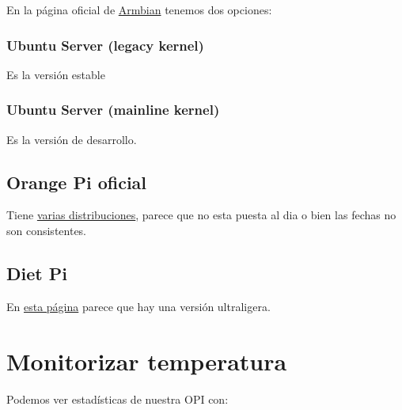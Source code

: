 \documentclass[12pt,spanish,]{scrartcl}
\begin{document}
En la página oficial de
\href{https://www.armbian.com/orange-pi-zero/}{Armbian} tenemos dos
opciones:

\hypertarget{ubuntu-server-legacy-kernel}{%
\subsubsection{Ubuntu Server (legacy
kernel)}\label{ubuntu-server-legacy-kernel}}

Es la versión estable

\hypertarget{ubuntu-server-mainline-kernel}{%
\subsubsection{Ubuntu Server (mainline
kernel)}\label{ubuntu-server-mainline-kernel}}

Es la versión de desarrollo.

\hypertarget{orange-pi-oficial}{%
\subsection{Orange Pi oficial}\label{orange-pi-oficial}}

Tiene \href{http://www.orangepi.org/downloadresources/}{varias
distribuciones}, parece que no esta puesta al dia o bien las fechas no
son consistentes.

\hypertarget{diet-pi}{%
\subsection{Diet Pi}\label{diet-pi}}

En \href{http://dietpi.com/}{esta página} parece que hay una versión
ultraligera.

\hypertarget{monitorizar-temperatura}{%
\section{Monitorizar temperatura}\label{monitorizar-temperatura}}

Podemos ver estadísticas de nuestra OPI con:
\end{document}
